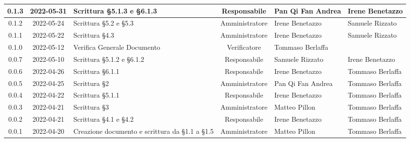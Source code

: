 \begin{center}
\begin{longtable}{ |c|c|p{8em}|c|m{5em}|m{5em}| }
	\hline 
	0.1.3 & 2022-05-31 & Scrittura §5.1.3 e §6.1.3 & Responsabile & Pan Qi Fan \newline Andrea & Irene \newline Benetazzo \\
	\hline
	0.1.2 & 2022-05-24 & Scrittura §5.2 e §5.3 & Amministratore & Irene \newline Benetazzo & Samuele \newline Rizzato \\
	\hline
	0.1.1 & 2022-05-22 & Scrittura §4.3 & Amministratore & Irene \newline Benetazzo & Samuele \newline Rizzato \\
	\hline 
	0.1.0 & 2022-05-12 & Verifica Generale Documento & Verificatore & Tommaso \newline Berlaffa  & \\
    \hline
	0.0.7 & 2022-05-10 & Scrittura §5.1.2 e §6.1.2 & Responsabile & Samuele \newline Rizzato & Irene \newline Benetazzo \\
	\hline
	0.0.6 & 2022-04-26 & Scrittura §6.1.1 & Responsabile & Irene \newline Benetazzo & Tommaso \newline Berlaffa\\
	\hline 
	0.0.5& 2022-04-25 & Scrittura §2 & Amministratore & Pan Qi Fan \newline Andrea & Tommaso \newline Berlaffa\\
	\hline
	0.0.4 & 2022-04-22 & Scrittura §5.1.1 & Responsabile & Irene \newline Benetazzo & Tommaso \newline Berlaffa\\
	\hline 
	0.0.3 & 2022-04-21 & Scrittura §3 & Amministratore & Matteo \newline Pillon & Tommaso \newline Berlaffa\\
	\hline
	0.0.2 & 2022-04-21 & Scrittura \newline §4.1 e §4.2 & Responsabile & Irene \newline Benetazzo & Tommaso \newline Berlaffa\\
	\hline
    0.0.1 & 2022-04-20 & Creazione documento e scrittura \newline da §1.1 a §1.5 & Amministratore & Matteo \newline Pillon & Tommaso \newline Berlaffa \\ 
	\hline
	\end{longtable}
	\end{center}
	\newpage